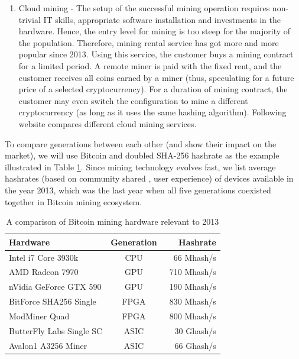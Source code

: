 \documentclass[preprint,12pt,3p]{elsarticle}
\begin{document}
\begin{enumerate}
    \item Cloud mining - The setup of the successful mining operation requires non-trivial IT skills, appropriate software installation and investments in the hardware. Hence, the entry level for mining is too steep for the majority of the population. Therefore, mining rental service has got more and more popular since 2013. Using this service, the customer buys a mining contract for a limited period. A remote miner is paid with the fixed rent, and the customer receives all coins earned by a miner (thus, speculating for a future price of a selected cryptocurrency). For a duration of mining contract, the customer may even switch the configuration to mine a different cryptocurrency (as long as it uses the same hashing algorithm). Following website \cite{COMPARECLOUD} compares different cloud mining services.
\end{enumerate}

To compare generations between each other (and show their impact on the market), we will use Bitcoin and doubled SHA-256 hashrate as the example illustrated in Table \ref{tab:hardware}. Since mining technology evolves fast, we list average hashrates (based on community shared \cite{BITCOINITMINING}, \cite{BITCOINITNONMINING} user experience) of devices available in the year 2013, which was the last year when all five generations coexisted together in Bitcoin mining ecosystem.

\begin{table}
\centering
\begin{tabular}{|l|c|r|} 
    \hline
    \textbf{Hardware} & \textbf{Generation} & \textbf{Hashrate} \\
    \hline\hline
    Intel i7 Core 3930k & CPU & ~66 Mhash/s \\
    \hline
    AMD Radeon 7970 & GPU & ~710 Mhash/s \\
    \hline
    nVidia GeForce GTX 590 & GPU & ~190 Mhash/s \\
    \hline
    BitForce SHA256 Single & FPGA & ~830 Mhash/s \\
    \hline
    ModMiner Quad & FPGA & ~800 Mhash/s \\
    \hline
    ButterFly Labs Single SC & ASIC & ~30 Ghash/s \\
    \hline
    Avalon1 A3256 Miner & ASIC & ~66 Ghash/s \\
    \hline
\end{tabular}
\caption{A comparison of Bitcoin mining hardware relevant to 2013}
\label{tab:hardware} 
\end{table}
\end{document}

